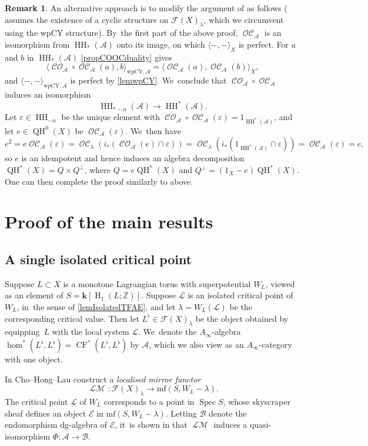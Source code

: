 \documentclass[JEP,XML,SOM,Unicode,NoEqCountersInSection,NoFloatCountersInSection,published]{cedram}
\theoremstyle{definition}
\newtheorem{remark}[theorem]{Remark}
\let\eps\varepsilon
\newcommand{\ZZ}{\mathbb{Z}}
\newcommand{\LL}{L^\flat}
\newcommand{\calA}{\mathcal{A}}
\newcommand{\calB}{\mathcal{B}}
\newcommand{\calE}{\mathcal{E}}
\newcommand{\calL}{\mathcal{L}}
\newcommand{\Fuk}{\mathcal{F}}
\newcommand{\kk}{{\boldsymbol{k}}}
\newcommand{\mf}{\mathrm{mf}}
\newcommand{\rH}{\operatorname{H}}
\newcommand{\HH}{\operatorname{HH}}
\newcommand{\CF}{\operatorname{CF}}
\newcommand{\Spec}{\operatorname{Spec}}
\newcommand{\LMF}[1][]{\operatorname{\mathcal{LM}}_{#1}}
\newcommand{\CO}{\operatorname{\mathcal{CO}}}
\newcommand{\OC}{\operatorname{\mathcal{OC}}}
\newcommand{\QH}{\operatorname{QH}}
\begin{document}
\begin{remark}
An alternative approach is to modify the argument of \cite[Th.\,4.10]{Sanda} as follows (\cite{Sanda} assumes the existence of a cyclic structure on $\Fuk(X)_\lambda$, which we circumvent using the wpCY structure). By~the first part of the above proof, $\OC_\calA$ is an isomorphism from $\HH_*(\calA)$ onto its image, on which $\langle {-}, {-} \rangle_X$ is perfect. For $a$ and $b$ in $\HH_*(\calA)$ \cref{propCOOCduality} gives
\[
\langle \CO_\calA \circ \OC_\calA(a), b \rangle_{\mathrm{wpCY}, \calA} = \langle \OC_\calA(a), \OC_\calA(b) \rangle_X,
\]
and $\langle {-}, {-} \rangle_{\mathrm{wpCY}, \calA}$ is perfect by \cref{lemwpCY}. We~conclude that $\CO_\calA \circ \OC_\calA$ induces an isomorphism
\[
\HH_{*-n}(\calA) \to \HH^*(\calA).
\]
Let $\eps \in \HH_{-n}$ be the unique element with $\CO_\calA \circ \OC_\calA (\eps) = 1_{\HH^*(\calA)}$, and let $e \in \QH^0(X)$ be $\OC_\calA(\eps)$. We~then have
\[
e^2 = e \OC_\calA(\eps) = \OC_\lambda(i_*(\CO_\calA(e) \cap \eps)) = \OC_\lambda(i_*(1_{\HH^*(\calA)} \cap \eps)) = \OC_\calA(\eps) = e,
\]
so $e$ is an idempotent and hence induces an algebra decomposition $\QH^*(X) = Q \times Q^\perp$, where $Q = e \QH^*(X)$ and $Q^\perp = (1_X - e) \QH^*(X)$. One can then complete the proof similarly to above.
\end{remark}

\section{Proof of the main results}
\label{secProofMain}

\subsection{A single isolated critical point}
\label{sscLMF}

Suppose $L \subset X$ is a monotone Lagrangian torus with superpotential $W_L$, viewed as an element of $S = \kk[\rH_1(L; \ZZ)]$. Suppose $\calL$ is an isolated critical point of $W_L$, in~the sense of \cref{lemIsolatedTFAE}, and let $\lambda = W_L(\calL)$ be the corresponding critical value. Then let $\LL \in \Fuk(X)_\lambda$ be the object obtained by equipping~$L$ with the local system $\calL$. We~denote the $A_\infty$-algebra $\hom^*(\LL, \LL) = \CF^*(\LL, \LL)$ by $\calA$, which we also view as an $A_\infty$-category with one object.

In \cite{ChoHongLauTorus} Cho--Hong--Lau construct a \emph{localised mirror functor}
\[
\LMF : \Fuk(X)_\lambda \to \mf(S, W_L - \lambda).
\]
The critical point $\calL$ of $W_L$ corresponds to a point in $\Spec S$, whose skyscraper sheaf defines an object $\calE$ in $\mf(S, W_L - \lambda)$. Letting $\calB$ denote the endomorphism dg-algebra of $\calE$, it~is shown in \cite[Th.\,5]{SmithSuperfiltered} that $\LMF$ induces a quasi-isomorphism $\Phi : \calA \to \calB$.
\end{document}
